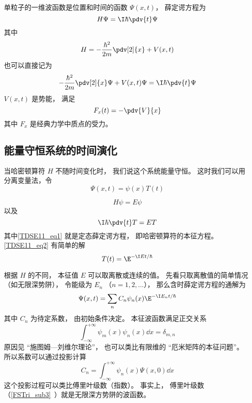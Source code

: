 
\begin{issues}
\issueDraft
\end{issues}


单粒子的一维波函数是位置和时间的函数 $\Psi(x, t)$， 薛定谔方程为
\begin{equation}
H\Psi = \I\hbar \pdv{t}\Psi
\end{equation}
其中
\begin{equation}
H = -\frac{\hbar^2}{2m}\pdv[2]{x} + V(x, t)
\end{equation}
也可以直接记为
\begin{equation}\label{TDSE11_eq3}
-\frac{\hbar^2}{2m}\pdv[2]{x}\Psi + V(x, t)\Psi = \I\hbar \pdv{t}\Psi
\end{equation}
$V(x,t)$ 是势能， 满足
\begin{equation}
F_x(t) = -\pdv{V}{x}
\end{equation}
其中 $F_x$ 是经典力学中质点的受力。

\subsection{能量守恒系统的时间演化}
当哈密顿算符 $H$ 不随时间变化时， 我们说这个系统能量守恒。 这时我们可以用分离变量法，令
\begin{equation}
\Psi(x, t) = \psi(x) T(t)
\end{equation}
 
\begin{equation}\label{TDSE11_eq1}
H\psi = E\psi
\end{equation}
以及
\begin{equation}\label{TDSE11_eq2}
\I \hbar\pdv{t}T = ET
\end{equation}
其中\autoref{TDSE11_eq1} 就是定态薛定谔方程， 即哈密顿算符的本征方程。 \autoref{TDSE11_eq2} 有简单的解
\begin{equation}
T(t) = \E^{-\I E t/\hbar}
\end{equation}

根据 $H$ 的不同， 本征值 $E$ 可以取离散或连续的值。 先看只取离散值的简单情况（如无限深势阱）， 令能级为 $E_n$ （$n = 1, 2, \dots$）， 那么含时薛定谔方程的通解为
\begin{equation}\label{TDSE11_eq5}
\Psi(x, t) = \sum_n C_n \psi_n(x) \E^{-\I E_n t/\hbar}
\end{equation}
其中 $C_n$ 为待定系数， 由初始条件决定。 本征波函数满足正交关系
\begin{equation}
\int_{-\infty}^{+\infty}\psi_m(x)\psi_n(x)\dd{x} = \delta_{m,n}
\end{equation}
原因见 “施图姆—刘维尔理论”， 也可以类比有限维的 “厄米矩阵的本征问题”。 所以系数可以通过投影计算
\begin{equation}
C_n = \int_{-\infty}^{+\infty} \psi_n(x)\Psi(x, 0) \dd{x}
\end{equation}
这个投影过程可以类比傅里叶级数（指数）。 事实上， 傅里叶级数（\autoref{FSTri_sub3}~）就是无限深方势阱的波函数。

